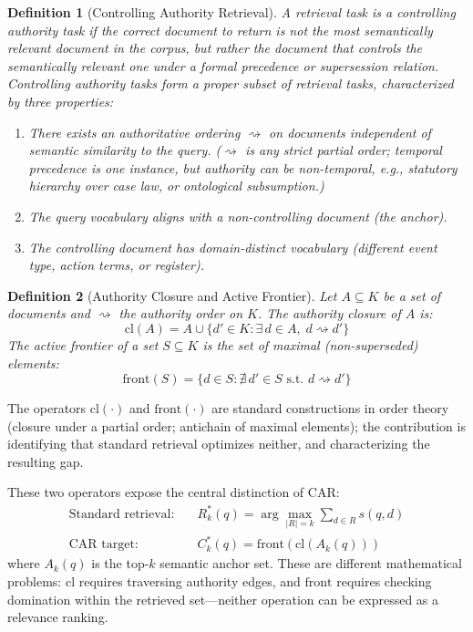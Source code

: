 \documentclass[11pt]{article}
\newtheorem{definition}{Definition}
\begin{document}
\begin{definition}[Controlling Authority Retrieval]
\label{def:controlling_authority}
A retrieval task is a \emph{controlling authority task} if the correct document to return is not the most semantically relevant document in the corpus, but rather the document that \emph{controls} the semantically relevant one under a formal precedence or supersession relation. Controlling authority tasks form a proper subset of retrieval tasks, characterized by three properties:
\begin{enumerate}[noitemsep,label=(\roman*)]
  \item There exists an authoritative ordering $\rightsquigarrow$ on documents independent of semantic similarity to the query. ($\rightsquigarrow$ is any strict partial order; temporal precedence is one instance, but authority can be non-temporal, e.g., statutory hierarchy over case law, or ontological subsumption.)
  \item The query vocabulary aligns with a non-controlling document (the \emph{anchor}).
  \item The controlling document has domain-distinct vocabulary (different event type, action terms, or register).
\end{enumerate}
\end{definition}

\begin{definition}[Authority Closure and Active Frontier]
\label{def:closure}
Let $A \subseteq K$ be a set of documents and $\rightsquigarrow$ the authority order on $K$.
The \emph{authority closure} of $A$ is:
\[
  \mathrm{cl}(A) = A \cup \{d' \in K : \exists\, d \in A,\; d \rightsquigarrow d'\}
\]
The \emph{active frontier} of a set $S \subseteq K$ is the set of maximal (non-superseded) elements:
\[
  \mathrm{front}(S) = \{d \in S : \nexists\, d' \in S \text{ s.t.\ } d \rightsquigarrow d'\}
\]
\end{definition}

The operators $\mathrm{cl}(\cdot)$ and $\mathrm{front}(\cdot)$ are standard constructions in order theory (closure under a partial order; antichain of maximal elements); the contribution is identifying that standard retrieval optimizes neither, and characterizing the resulting gap.

These two operators expose the central distinction of CAR:
\begin{align}
  \text{Standard retrieval:} &\quad R^*_k(q) = \arg\max_{|R|=k} \sum_{d \in R} s(q,d) \label{eq:std} \\
  \text{CAR target:}         &\quad C^*_k(q) = \mathrm{front}(\mathrm{cl}(A_k(q))) \label{eq:car}
\end{align}
where $A_k(q)$ is the top-$k$ semantic anchor set. These are different mathematical problems: $\mathrm{cl}$ requires traversing authority edges, and $\mathrm{front}$ requires checking domination within the retrieved set---neither operation can be expressed as a relevance ranking.
\end{document}
